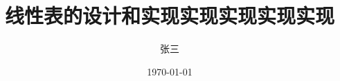 \documentclass[supercite,fontset=windows]{upcthesis}
\title{线性表的设计和实现实现实现实现实现}
\author{张\hspace{0.53cm}三}
\date{\today}
\begin{document}
\maketitle
\ClearPageStyle



\ClearPageStyle


\ClearPageStyle


\tableofcontents
\ClearPageStyle



\setcounter{page}{1}





% 			


% 
% 
% 
% 

\begin{PrintMode}

\end{PrintMode}


\begin{PrintMode}
	
\end{PrintMode}



\end{document}
